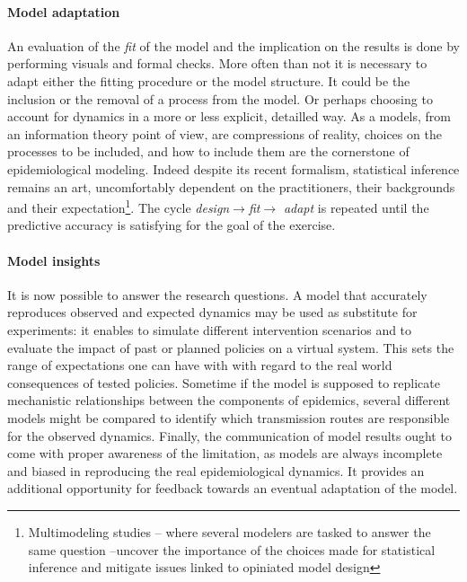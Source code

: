 \paragraph{Model adaptation} An evaluation of the \textit{fit} of the model and the implication on the results is done by performing visuals and formal checks. More often than not it is necessary to adapt either the fitting procedure or the model structure. It could be the inclusion or the removal of a process from the model. Or perhaps choosing to account for dynamics in a more or less explicit, detailled way. As a models, from an information theory point of view, are compressions of reality, choices on the processes to be included, and how to include them are the cornerstone of epidemiological modeling. Indeed despite its recent formalism, statistical inference remains an art, uncomfortably dependent on the practitioners, their backgrounds and their expectation\footnote{Multimodeling studies -- where several modelers are tasked to answer the same question --uncover the importance of the choices made for statistical inference and mitigate issues linked to opiniated model design}. The cycle \textit{design}$\rightarrow$\textit{fit}$\rightarrow$ \textit{adapt} is repeated until the predictive accuracy is satisfying for the goal of the exercise. 

\paragraph{Model insights}  It is now possible to answer the research questions. A model that accurately reproduces observed and expected dynamics may be used as substitute for experiments: it enables to simulate different intervention scenarios and to evaluate the impact of past or planned policies on a virtual system. This sets the range of expectations one can have with with regard to the real world consequences of tested policies. Sometime if the model is supposed to replicate mechanistic relationships between the components of epidemics, several different models might be compared to identify which transmission routes are responsible for the observed dynamics.  Finally, the communication of model results ought to come with proper awareness of the limitation, as models are always incomplete and biased in reproducing the real epidemiological dynamics. It provides an additional opportunity for feedback towards an eventual adaptation of the model\cite{Heesterbeek:ModelingInfectiousDisease:2015}. 

